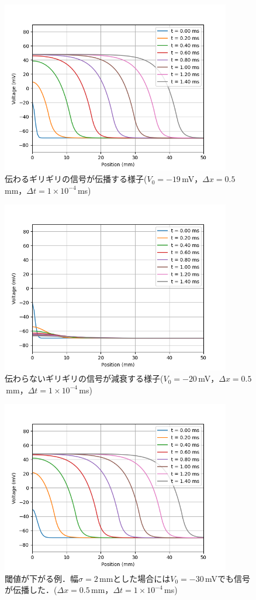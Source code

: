 \documentclass[a4paper,11pt]{jsarticle}
\begin{document}
\begin{figure}[htbp]
  \centering
  \includegraphics[width=10cm]{limit_-19mV.png}
  \caption{伝わるギリギリの信号が伝播する様子($V_0=-19$\,mV，$\Delta x=0.5$\,mm，$\Delta t = 1\times 10^{-4}$\,ms)}
  \label{fig:lim1}
\end{figure}

\begin{figure}[htbp]
  \centering
  \includegraphics[width=10cm]{limit_-20mV.png}
  \caption{伝わらないギリギリの信号が減衰する様子($V_0=-20$\,mV，$\Delta x=0.5$\,mm，$\Delta t = 1\times 10^{-4}$\,ms)}
  \label{fig:lim2}
\end{figure}

\begin{figure}[htbp]
  \centering
  \includegraphics[width=10cm]{wave_s=2.png}
  \caption{閾値が下がる例．幅$\sigma=2$\,mmとした場合には$V_0=-30$\,mVでも信号が伝播した．($\Delta x=0.5$\,mm，$\Delta t = 1\times 10^{-4}$\,ms)}
  \label{fig:s_2}
\end{figure}
\end{document}
